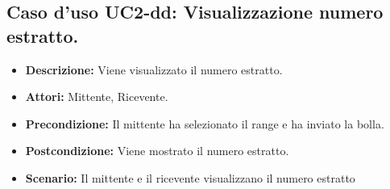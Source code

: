\subsection{Caso d'uso UC2-dd: Visualizzazione numero estratto.}
\begin{itemize}
\item[]\textbf{Descrizione:} Viene visualizzato il numero estratto.
\item[]\textbf{Attori:} Mittente, Ricevente. 
\item[]\textbf{Precondizione:} Il mittente ha selezionato il range e ha inviato la bolla. 
\item[]\textbf{Postcondizione:} Viene mostrato il numero estratto. 
\item[]\textbf{Scenario:}
Il mittente e il ricevente visualizzano il numero estratto 
\end{itemize}

\clearpage

